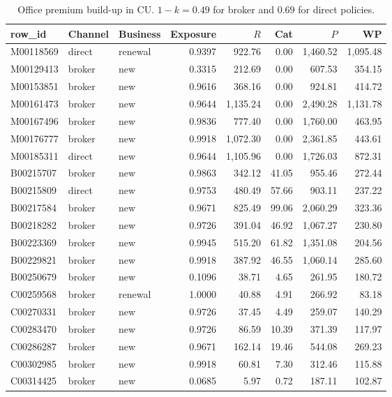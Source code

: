 \begin{table}[h]
\centering
\small
\begin{tabular}{lllrrrrr}
\hline
row\_id & Channel & Business & Exposure & $R$ & Cat & $P$ & WP\\
\hline
M00118569 & direct & renewal & 0.9397 & 922.76 & 0.00 & 1,460.52 & 1,095.48\\
M00129413 & broker & new & 0.3315 & 212.69 & 0.00 & 607.53 & 354.15\\
M00153851 & broker & new & 0.9616 & 368.16 & 0.00 & 924.81 & 414.72\\
M00161473 & broker & new & 0.9644 & 1,135.24 & 0.00 & 2,490.28 & 1,131.78\\
M00167496 & broker & new & 0.9836 & 777.40 & 0.00 & 1,760.00 & 463.95\\
M00176777 & broker & new & 0.9918 & 1,072.30 & 0.00 & 2,361.85 & 443.61\\
M00185311 & direct & new & 0.9644 & 1,105.96 & 0.00 & 1,726.03 & 872.31\\
B00215707 & broker & new & 0.9863 & 342.12 & 41.05 & 955.46 & 272.44\\
B00215809 & direct & new & 0.9753 & 480.49 & 57.66 & 903.11 & 237.22\\
B00217584 & broker & new & 0.9671 & 825.49 & 99.06 & 2,060.29 & 323.36\\
B00218282 & broker & new & 0.9726 & 391.04 & 46.92 & 1,067.27 & 230.80\\
B00223369 & broker & new & 0.9945 & 515.20 & 61.82 & 1,351.08 & 204.56\\
B00229821 & broker & new & 0.9918 & 387.92 & 46.55 & 1,060.14 & 285.60\\
B00250679 & broker & new & 0.1096 & 38.71 & 4.65 & 261.95 & 180.72\\
C00259568 & broker & renewal & 1.0000 & 40.88 & 4.91 & 266.92 & 83.18\\
C00270331 & broker & new & 0.9726 & 37.45 & 4.49 & 259.07 & 140.29\\
C00283470 & broker & new & 0.9726 & 86.59 & 10.39 & 371.39 & 117.97\\
C00286287 & broker & new & 0.9671 & 162.14 & 19.46 & 544.08 & 269.23\\
C00302985 & broker & new & 0.9918 & 60.81 & 7.30 & 312.46 & 115.88\\
C00314425 & broker & new & 0.0685 & 5.97 & 0.72 & 187.11 & 102.87\\
\hline
\end{tabular}
\caption{Office premium build-up in CU. $1-k = 0.49$ for broker and $0.69$ for direct policies.}
\label{ov:tab-op1}
\end{table}

